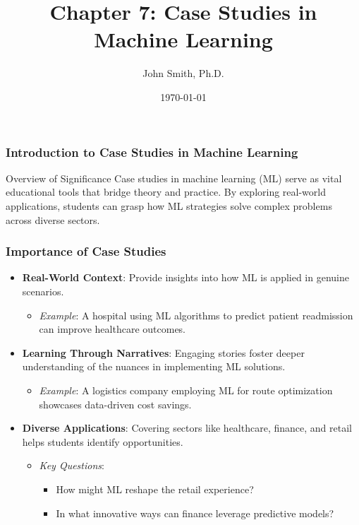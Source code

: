 \documentclass[aspectratio=169]{beamer}
\title[Machine Learning Case Studies]{Chapter 7: Case Studies in Machine Learning}
\author[J. Smith]{John Smith, Ph.D.}
\institute[University Name]{
  Department of Computer Science\\
  University Name\\
  \vspace{0.3cm}
  Email: email@university.edu\\
  Website: www.university.edu
}
\date{\today}
\begin{document}
\frame{\titlepage}

\begin{frame}[fragile]
    \frametitle{Introduction to Case Studies in Machine Learning}
    \begin{block}{Overview of Significance}
        Case studies in machine learning (ML) serve as vital educational tools that bridge theory and practice. By exploring real-world applications, students can grasp how ML strategies solve complex problems across diverse sectors.
    \end{block}
\end{frame}

\begin{frame}[fragile]
    \frametitle{Importance of Case Studies}
    \begin{itemize}
        \item \textbf{Real-World Context}: Provide insights into how ML is applied in genuine scenarios.
            \begin{itemize}
                \item \textit{Example}: A hospital using ML algorithms to predict patient readmission can improve healthcare outcomes.
            \end{itemize}
        
        \item \textbf{Learning Through Narratives}: Engaging stories foster deeper understanding of the nuances in implementing ML solutions.
            \begin{itemize}
                \item \textit{Example}: A logistics company employing ML for route optimization showcases data-driven cost savings.
            \end{itemize}
        
        \item \textbf{Diverse Applications}: Covering sectors like healthcare, finance, and retail helps students identify opportunities.
            \begin{itemize}
                \item \textit{Key Questions}:
                    \begin{itemize}
                        \item How might ML reshape the retail experience?
                        \item In what innovative ways can finance leverage predictive models?
                    \end{itemize}
            \end{itemize}
    \end{itemize}
\end{frame}
\end{document}
